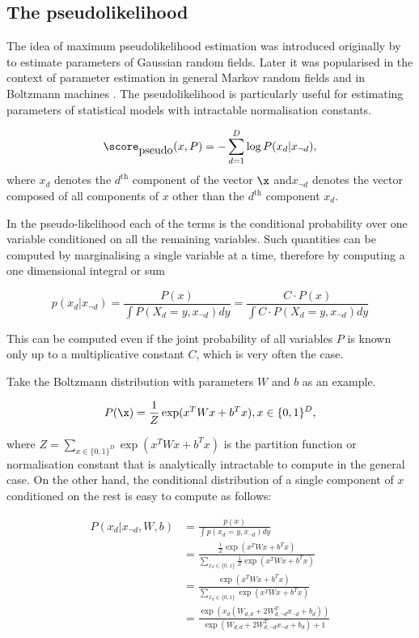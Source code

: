 \subsection{The pseudolikelihood}

The idea of maximum pseudolikelihood estimation was introduced originally by \citet{Besag1977} to estimate parameters of Gaussian random fields. Later it was popularised in the context of parameter estimation in general Markov random fields \citep{Comets1992} and in Boltzmann machines \citep{Hyvarinen2006}. The pseudolikelihood is particularly useful for estimating parameters of statistical models with intractable normalisation constants.

\begin{equation}
	\score_{\mbox{pseudo}}(x,P) = - \sum_{d=1}^{D} \log P(x_d\vert x_{\neg d}),
\end{equation}
where $x_d$ denotes the $d^{\mbox{th}}$ component of the vector $\x$ and$x_{\neg d}$ denotes the vector composed of all components of $x$ other than the $d^{\mbox{th}}$ component $x_d$.

In the pseudo-likelihood each of the terms is the conditional probability over one variable conditioned on all the remaining variables. Such quantities can be computed by marginalising a single variable at a time, therefore by computing a one dimensional integral or sum

\begin{equation}
	p(x_d\vert x_{\neg d}) = \frac{P(x)}{\int P(X_d=y,x_{\neg d}) dy} = \frac{C \cdot P(x)}{\int C \cdot P(X_d=y,x_{\neg d}) dy}
\end{equation}

This can be computed even if the joint probability of all variables $P$ is known only up to a multiplicative constant $C$, which is very often the case.

Take the Boltzmann distribution with parameters $W$ and $b$ as an example. 

\begin{equation}
	P(\x) = \frac{1}{Z}\exp(x^{T}Wx + b^{T}x), x\in\{0,1\}^D,
\end{equation}

where $Z = \sum_{x\in\{0,1\}^D}\exp(x^{T}Wx + b^{T}x)$ is the partition function or normalisation constant that is analytically intractable to compute in the general case. On the other hand, the conditional distribution of a single component of $x$ conditioned on the rest is easy to compute as follows:

\begin{align}
	P(x_d\vert x_{\neg d}, W, b) &= \frac{p(x)}{\int p(x_d=y,x_{\neg d}) dy}\\
		&= \frac{\frac{1}{Z}\exp(x^{T}Wx + b^{T}x)}{\sum_{x_d\in\{0,1\}}\frac{1}{Z}\exp(x^{T}Wx + b^{T}x)}\\
		&= \frac{\exp(x^{T}Wx + b^{T}x)}{\sum_{x_d\in\{0,1\}}\exp(x^{T}Wx + b^{T}x)}\\
		&= \frac{\exp\left( x_d \left( W_{d,d} + 2 W_{d,\neg d}^{T}x_{\neg d} + b_d \right)\right)}{\exp( W_{d,d} + 2 W_{d,\neg d}^{T}x_{\neg d} + b_{d}) + 1}\\
\end{align}

